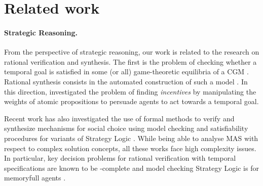 \section{Related work }
\label{sec:related}


\paragraph*{Strategic Reasoning.}

From the perspective of strategic reasoning, our work is related to the research on rational verification and synthesis. The first is the problem of checking whether a temporal goal is 
satisfied in some (or all) game-theoretic equilibria of a CGM \cite{AbateGHHKNPSW21,GutierrezNPW23}. Rational synthesis consists in the automated construction of such a model \cite{FismanKL10, CFGR16}.  
In this direction, 
\cite{KR2024-44} investigated the problem of finding \emph{incentives} by manipulating the weights of atomic propositions to persuade %
agents to act towards a temporal goal. %




Recent work has also investigated the use of formal methods to verify and synthesize mechanisms for social choice using model checking and satisfiability procedures for variants of Strategy Logic \cite{SLKF_KR21,MittelmannMMP22,MittelmannMMP23}. 
While being able to analyse MAS with respect to complex solution concepts, all these works face high complexity issues. 
In particular, key decision problems for rational verification with temporal specifications are known to be \Dexptime-complete \cite{GutierrezNPW23} and model checking  Strategy Logic is \NONELEMENTARY for memoryfull agents \cite{MogaveroMPV14}. 


